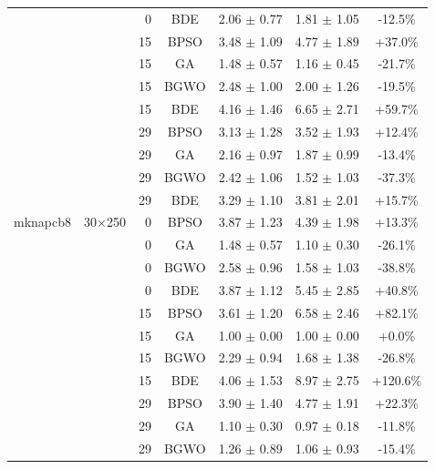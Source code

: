 \begin{table}[htbp]
\begin{tabular}{llrcccc}
             &          & 0 & BDE   & 2.06 $\pm$ 0.77    & 1.81 $\pm$ 1.05    & -12.5\% \\
             &          & 15 & BPSO  & 3.48 $\pm$ 1.09    & 4.77 $\pm$ 1.89    & +37.0\% \\
             &          & 15 & GA    & 1.48 $\pm$ 0.57    & 1.16 $\pm$ 0.45    & -21.7\% \\
             &          & 15 & BGWO  & 2.48 $\pm$ 1.00    & 2.00 $\pm$ 1.26    & -19.5\% \\
             &          & 15 & BDE   & 4.16 $\pm$ 1.46    & 6.65 $\pm$ 2.71    & +59.7\% \\
             &          & 29 & BPSO  & 3.13 $\pm$ 1.28    & 3.52 $\pm$ 1.93    & +12.4\% \\
             &          & 29 & GA    & 2.16 $\pm$ 0.97    & 1.87 $\pm$ 0.99    & -13.4\% \\
             &          & 29 & BGWO  & 2.42 $\pm$ 1.06    & 1.52 $\pm$ 1.03    & -37.3\% \\
             &          & 29 & BDE   & 3.29 $\pm$ 1.10    & 3.81 $\pm$ 2.01    & +15.7\% \\
mknapcb8     & 30×250   & 0 & BPSO  & 3.87 $\pm$ 1.23    & 4.39 $\pm$ 1.98    & +13.3\% \\
             &          & 0 & GA    & 1.48 $\pm$ 0.57    & 1.10 $\pm$ 0.30    & -26.1\% \\
             &          & 0 & BGWO  & 2.58 $\pm$ 0.96    & 1.58 $\pm$ 1.03    & -38.8\% \\
             &          & 0 & BDE   & 3.87 $\pm$ 1.12    & 5.45 $\pm$ 2.85    & +40.8\% \\
             &          & 15 & BPSO  & 3.61 $\pm$ 1.20    & 6.58 $\pm$ 2.46    & +82.1\% \\
             &          & 15 & GA    & 1.00 $\pm$ 0.00    & 1.00 $\pm$ 0.00    & +0.0\% \\
             &          & 15 & BGWO  & 2.29 $\pm$ 0.94    & 1.68 $\pm$ 1.38    & -26.8\% \\
             &          & 15 & BDE   & 4.06 $\pm$ 1.53    & 8.97 $\pm$ 2.75    & +120.6\% \\
             &          & 29 & BPSO  & 3.90 $\pm$ 1.40    & 4.77 $\pm$ 1.91    & +22.3\% \\
             &          & 29 & GA    & 1.10 $\pm$ 0.30    & 0.97 $\pm$ 0.18    & -11.8\% \\
             &          & 29 & BGWO  & 1.26 $\pm$ 0.89    & 1.06 $\pm$ 0.93    & -15.4\% \\

\end{tabular}
\end{table}
